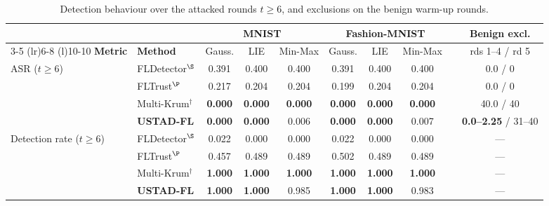 \documentclass[journal]{IEEEtran}
\begin{document}
\begin{table}[!t]
\centering
\caption{Detection behaviour over the attacked rounds $t \ge 6$, and exclusions on the benign warm-up rounds.}
\label{tab:detection_results}
\footnotesize
\setlength{\tabcolsep}{4.5pt}
\begin{tabular}{@{}llcccccc@{}cc@{}}
\toprule
& & \multicolumn{3}{c}{\textbf{MNIST}} & \multicolumn{3}{c}{\textbf{Fashion-MNIST}} & & \multicolumn{1}{c}{\textbf{Benign excl.}} \\
\cmidrule(lr){3-5} \cmidrule(lr){6-8} \cmidrule(l){10-10}
\textbf{Metric} & \textbf{Method} & Gauss. & LIE & Min-Max & Gauss. & LIE & Min-Max & & rds 1--4 / rd 5 \\
\midrule
\multirow{4}{*}{ASR ($t \ge 6$)}
 & FLDetector$^{\S}$   & 0.391 & 0.400 & 0.400 & 0.391 & 0.400 & 0.400 & & 0.0 / 0 \\
 & FLTrust$^{\P}$      & 0.217 & 0.204 & 0.204 & 0.199 & 0.204 & 0.204 & & 0.0 / 0 \\
 & Multi-Krum$^\dagger$ & \textbf{0.000} & \textbf{0.000} & \textbf{0.000} & \textbf{0.000} & \textbf{0.000} & \textbf{0.000} & & 40.0 / 40 \\
 & \textbf{USTAD-FL}   & \textbf{0.000} & \textbf{0.000} & 0.006 & \textbf{0.000} & \textbf{0.000} & 0.007 & & \textbf{0.0--2.25} / 31--40 \\
\midrule
\multirow{4}{*}{Detection rate ($t \ge 6$)}
 & FLDetector$^{\S}$   & 0.022 & 0.000 & 0.000 & 0.022 & 0.000 & 0.000 & & --- \\
 & FLTrust$^{\P}$      & 0.457 & 0.489 & 0.489 & 0.502 & 0.489 & 0.489 & & --- \\
 & Multi-Krum$^\dagger$ & \textbf{1.000} & \textbf{1.000} & \textbf{1.000} & \textbf{1.000} & \textbf{1.000} & \textbf{1.000} & & --- \\
 & \textbf{USTAD-FL}   & \textbf{1.000} & \textbf{1.000} & 0.985 & \textbf{1.000} & \textbf{1.000} & 0.983 & & --- \\
\bottomrule
\end{tabular}


\end{table}
\end{document}
